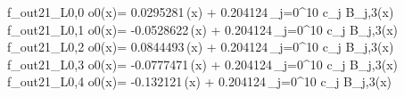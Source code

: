 f_{out21_L0,0	o0}(x)= 0.0295281\,\phi(x) + 0.204124\,\sum_{j=0}^{10} c_j B_{j,3}(x)
f_{out21_L0,1	o0}(x)= -0.0528622\,\phi(x) + 0.204124\,\sum_{j=0}^{10} c_j B_{j,3}(x)
f_{out21_L0,2	o0}(x)= 0.0844493\,\phi(x) + 0.204124\,\sum_{j=0}^{10} c_j B_{j,3}(x)
f_{out21_L0,3	o0}(x)= -0.0777471\,\phi(x) + 0.204124\,\sum_{j=0}^{10} c_j B_{j,3}(x)
f_{out21_L0,4	o0}(x)= -0.132121\,\phi(x) + 0.204124\,\sum_{j=0}^{10} c_j B_{j,3}(x)
